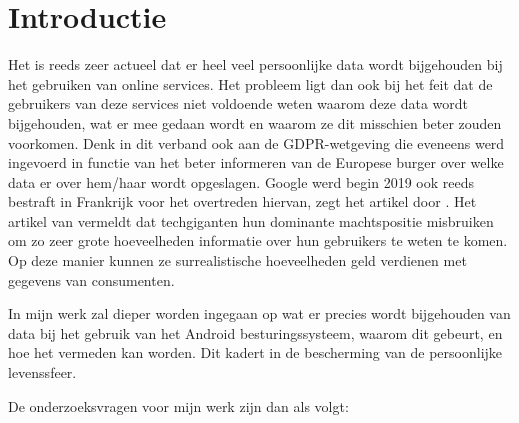 
\section{Introductie} %
\label{sec:introductie}



Het is reeds zeer actueel dat er heel veel persoonlijke data wordt bijgehouden bij het gebruiken van online services. Het probleem ligt dan ook bij het feit dat de gebruikers van deze services niet voldoende weten waarom deze data wordt bijgehouden, wat er mee gedaan wordt en waarom ze dit misschien beter zouden voorkomen. Denk in dit verband ook aan de GDPR-wetgeving die eveneens werd ingevoerd in functie van het beter informeren van de Europese burger over welke data er over hem/haar wordt opgeslagen. Google werd begin 2019 ook reeds bestraft in Frankrijk voor het overtreden hiervan, zegt het artikel door \cite{Boete2019}. Het artikel van \cite{LaurensVerhagen2019} vermeldt dat techgiganten hun dominante machtspositie misbruiken om zo zeer grote hoeveelheden informatie over hun gebruikers te weten te komen. Op deze manier kunnen ze surrealistische hoeveelheden geld verdienen met gegevens van consumenten.

\vspace{3mm}

\noindent In mijn werk zal dieper worden ingegaan op wat er precies wordt bijgehouden van data bij het gebruik van het Android besturingssysteem, waarom dit gebeurt, en hoe het vermeden kan worden. Dit kadert in de bescherming van de persoonlijke levenssfeer. 

\vspace{3mm}

\noindent De onderzoeksvragen voor mijn werk zijn dan als volgt:



